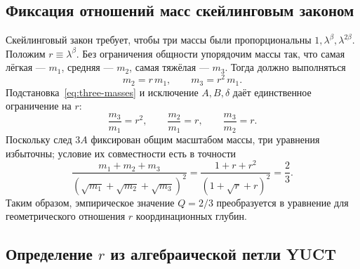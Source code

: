 \documentclass[11pt,a4paper]{article}
\theoremstyle{remark}
\begin{document}
	\subsection{Фиксация отношений масс скейлинговым законом}
	
	Скейлинговый закон требует, чтобы три массы были пропорциональны \(1, \lambda^{\beta}, \lambda^{2\beta}\). Положим \(r \equiv \lambda^{\beta}\). Без ограничения общности упорядочим массы так, что самая лёгкая — \(m_1\), средняя — \(m_2\), самая тяжёлая — \(m_3\). Тогда должно выполняться
	\begin{equation}
		m_2 = r\, m_1, \qquad m_3 = r^2\, m_1 .
	\end{equation}
	Подстановка~\eqref{eq:three-masses} и исключение \(A,B,\delta\) даёт единственное ограничение на \(r\):
	\begin{equation}
		\frac{m_3}{m_1} = r^2, \qquad
		\frac{m_2}{m_1} = r, \qquad
		\frac{m_3}{m_2} = r .
	\end{equation}
	Поскольку след \(3A\) фиксирован общим масштабом массы, три уравнения избыточны; условие их совместности есть в точности
	\begin{equation}
		\frac{m_1 + m_2 + m_3}{(\sqrt{m_1}+\sqrt{m_2}+\sqrt{m_3})^2}
		= \frac{1 + r + r^2}{(1 + \sqrt{r} + r)^2} = \frac{2}{3}.
		\label{eq:Qr}
	\end{equation}
	Таким образом, эмпирическое значение \(Q=2/3\) преобразуется в уравнение для геометрического отношения \(r\) координационных глубин.
	
	\subsection{Определение \(r\) из алгебраической петли YUCT}
	
\end{document}
